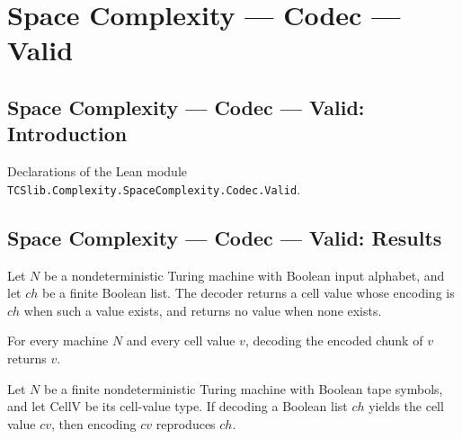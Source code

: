 \section{Space Complexity --- Codec --- Valid}
\subsection*{Space Complexity --- Codec --- Valid: Introduction}

Declarations of the Lean module \texttt{TCSlib.Complexity.SpaceComplexity.Codec.Valid}.

\subsection*{Space Complexity --- Codec --- Valid: Results}

\begin{definition}
\label{Complexity.Codec.decChunk}
\leanok
{}
Let $N$ be a nondeterministic Turing machine with Boolean input alphabet, and let $ch$
be a finite Boolean list. The decoder returns a cell value whose encoding is $ch$ when
such a value exists, and returns no value when none exists.
\end{definition}

\begin{lemma}
\label{Complexity.Codec.decChunk_encChunk}
\leanok
{}
For every machine $N$ and every cell value $v$, decoding the encoded chunk of $v$
returns $v$.
\end{lemma}

\begin{lemma}
\label{Complexity.Codec.encChunk_of_decChunk}
\leanok
{}
Let $N$ be a finite nondeterministic Turing machine with Boolean tape symbols, and let
$\mathrm{CellV}$ be its cell-value type. If decoding a Boolean list $ch$ yields the cell
value $cv$, then encoding $cv$ reproduces $ch$.
\end{lemma}


